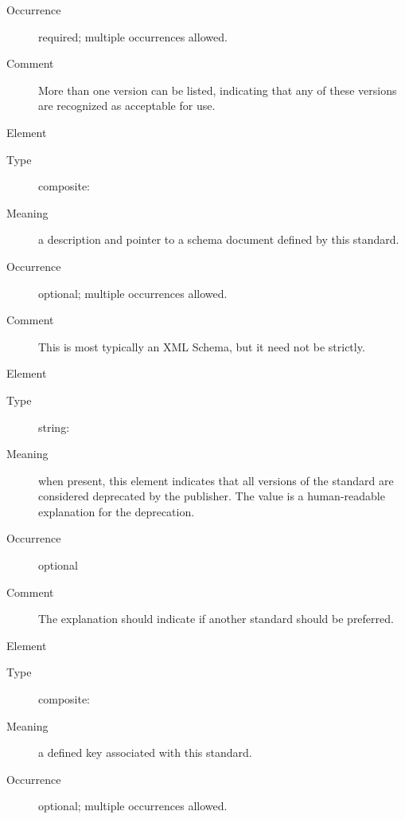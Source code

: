 \documentclass[11pt,a4paper]{ivoa}
\begin{document}
\begin{generated}
\begin{bigdescription}
\begin{description}
\item[Occurrence] required; multiple occurrences allowed.
\item[Comment]
                     More than one version can be listed, indicating
                     that any of these versions are recognized as
                     acceptable for use.


\end{description}
\item[Element \xmlel{schema}]
\begin{description}
\item[Type] composite: 
\item[Meaning]
                     a description and pointer to a schema document
                     defined by this standard.

\item[Occurrence] optional; multiple occurrences allowed.
\item[Comment]
                     This is most typically an XML Schema, but it need
                     not be strictly.


\end{description}
\item[Element \xmlel{deprecated}]
\begin{description}
\item[Type] string: 
\item[Meaning]
                     when present, this element indicates that all
                     versions of the standard are considered
                     deprecated by the publisher.  The value is a
                     human-readable explanation for the deprecation.

\item[Occurrence] optional
\item[Comment]
                     The explanation should indicate if another
                     standard should be preferred.


\end{description}
\item[Element \xmlel{key}]
\begin{description}
\item[Type] composite: 
\item[Meaning]
                     a defined key associated with this standard.

\item[Occurrence] optional; multiple occurrences allowed.

\end{description}


\end{bigdescription}\endgroup

\endgroup
\end{generated}
\end{document}
